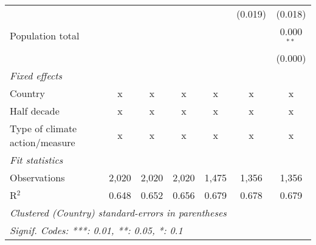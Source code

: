 \begin{tabular}{lcccccc}
                                                                             &         &                &                &                & (0.019)        & (0.018)\\   
   Population total                                                          &         &                &                &                &                & 0.000$^{**}$\\   
                                                                             &         &                &                &                &                & (0.000)\\   
   \emph{Fixed effects}\\
   Country                                                                   & x       & x              & x              & x              & x              & x\\  
   Half decade                                                               & x       & x              & x              & x              & x              & x\\  
   Type of climate action/measure                                            & x       & x              & x              & x              & x              & x\\  
   \midrule \emph{Fit statistics}\\
   Observations                                                              & 2,020   & 2,020          & 2,020          & 1,475          & 1,356          & 1,356\\  
   R$^2$                                                                     & 0.648   & 0.652          & 0.656          & 0.679          & 0.678          & 0.679\\  
   \midrule
   \multicolumn{7}{l}{\emph{Clustered (Country) standard-errors in parentheses}}\\
   \multicolumn{7}{l}{\emph{Signif. Codes: ***: 0.01, **: 0.05, *: 0.1}}\\
\end{tabular}
\par\endgroup


